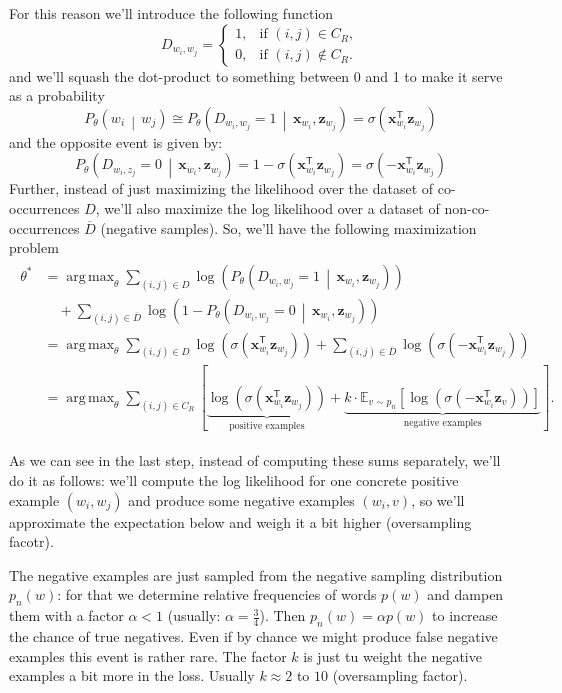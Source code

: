 \documentclass[a2paper,8pt]{extarticle}
\newcommand{\nin}{\not\in}
\newcommand{\cProb}[3][]{P_{#1}\left( #2 \,\middle|\, #3 \right)}
\newcommand{\Exp}[2][]{{\mathbb{E}_{#1}}\left[ #2
\right]}
\newcommand*{\T}{\mathsf{T}}
\DeclareMathOperator*{\argmax}{arg\,max}
\renewcommand{\vec}[1]{\mathbf{#1}}
\newcommand{\vx}{\vec{x}}
\newcommand{\vz}{\vec{z}}
\begin{document}
\begin{landscape}
\begin{multicols*}{7}
For this reason we'll introduce the following function
\[
D_{w_i,w_j}
=
\begin{cases}
1,& \text{if }(i,j)\in C_R,\\
0,& \text{if }(i,j)\nin C_R.
\end{cases}
\]
and we'll squash the dot-product to something between 0 and 1 to make it serve
as a probability
\[
\cProb[\theta]{w_i}{w_j}
\cong\cProb[\theta]{D_{w_i,w_j}=1}{\vx_{w_i},\vz_{w_j}}
=\sigma(\vx_{w_i}^\T\vz_{w_j})
\]
and the opposite event is given by:
\[
\cProb[\theta]{D_{w_i,z_j}=0}{\vx_{w_i},\vz_{w_j}}
=1-\sigma(\vx_{w_i}^\T\vz_{w_j})
=\sigma(-\vx_{w_i}^\T\vz_{w_j})
\]
Further, instead of just maximizing the likelihood over the dataset of
co-occurrences $D$, we'll also maximize the log likelihood over a dataset of
non-co-occurrences $\overline{D}$ (negative samples). So, we'll have the
following maximization problem
\begin{gather*}
\begin{align*}
\theta^*
&=\argmax_{\theta}
\sum_{(i,j)\in D}
\log\left(\cProb[\theta]{D_{w_i,w_j}=1}{\vx_{w_i},\vz_{w_j}}\right)
\\
&\quad+
\sum_{(i,j)\in \overline{D}}
\log\left(1-\cProb[\theta]{D_{w_i,w_j}=0}{\vx_{w_i},\vz_{w_j}}\right)
\\
&=\argmax_{\theta}
\sum_{(i,j)\in D}
\log\left(\sigma(\vx_{w_i}^\T\vz_{w_j})\right)
+
\sum_{(i,j)\in \overline{D}}
\log\left(\sigma(-\vx_{w_i}^\T\vz_{w_j})\right)
\\
&=\argmax_{\theta}
\sum_{(i,j)\in C_R}
\left[
\underbrace{\log(\sigma(\vx_{w_i}^\T\vz_{w_j}))}_{\text{positive examples}}
+
\underbrace{k\cdot\Exp[v\sim p_n]{\log(\sigma(-\vx_{w_i}^\T\vz_{v}))}}_{\text{
negative examples}}
\right].
\end{align*}
\end{gather*}

As we can see in the last step, instead of computing these sums separately,
we'll do it as follows: we'll compute the log likelihood for one concrete
positive example $(w_i,w_j)$ and produce some negative examples $(w_i,v)$, so
we'll approximate the expectation below and weigh it a bit higher (oversampling
facotr).

The negative examples are just sampled from the negative sampling
distribution $p_n(w)$: for that we determine relative frequencies of words
$p(w)$ and dampen them with a factor $\alpha<1$ (usually: $\alpha=\frac{3}{4}$).
Then $p_n(w)=\alpha p(w)$ to increase the chance of true negatives. Even if by
chance we might produce false negative examples this event is rather rare. The
factor $k$ is just tu weight the negative examples a bit more in the loss.
Usually $k\approx 2$ to $10$ (oversampling factor).


\end{multicols*}
\end{landscape}
\end{document}
